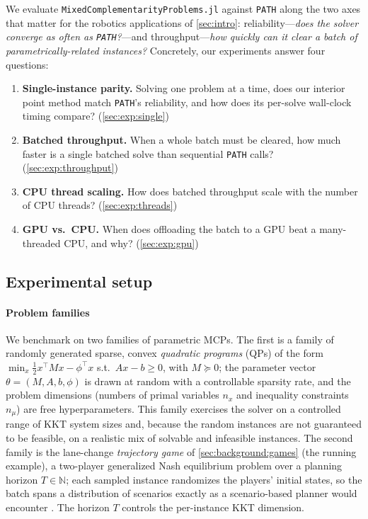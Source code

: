 \documentclass[conference]{IEEEtran}
\begin{document}
We evaluate \texttt{MixedComplementarityProblems.jl} against \texttt{PATH} along the two
axes that matter for the robotics applications of \cref{sec:intro}: reliability---\emph{does the solver converge as often as \texttt{PATH}?}---and throughput---\emph{how quickly
can it clear a batch of parametrically-related instances?} Concretely, our experiments
answer four questions:
\begin{enumerate}
  \item \textbf{Single-instance parity.} Solving one problem at a time, does our
  interior point method match \texttt{PATH}'s reliability, and how does its per-solve
  wall-clock timing compare? (\cref{sec:exp:single})
  \item \textbf{Batched throughput.} When a whole batch must be cleared, how much faster
  is a single batched solve than sequential \texttt{PATH} calls? (\cref{sec:exp:throughput})
  \item \textbf{CPU thread scaling.} How does batched throughput scale with the number of
  CPU threads? (\cref{sec:exp:threads})
  \item \textbf{GPU vs.\ CPU.} When does offloading the batch to a GPU beat a
  many-threaded CPU, and why? (\cref{sec:exp:gpu})
\end{enumerate}

\subsection{Experimental setup}
\label{sec:exp:setup}

\paragraph{Problem families}
We benchmark on two families of parametric MCPs. The first is a family of randomly
generated sparse, convex \emph{quadratic programs} (QPs) of the form $\min_x \tfrac12
x^\top M x - \phi^\top x$ s.t.\ $Ax - b \ge 0$, with $M \succeq 0$; the parameter vector
$\theta = (M, A, b, \phi)$ is drawn at random with a controllable sparsity rate, and the
problem dimensions (numbers of primal variables $n_x$ and inequality constraints
$n_\mu$) are free hyperparameters. This family exercises the solver on a controlled range of KKT
system sizes and, because the random instances are not guaranteed to be feasible, on a realistic
mix of solvable and infeasible instances. The second family is the lane-change
\emph{trajectory game} of \cref{sec:background:games} (the running example), a two-player
generalized Nash equilibrium problem over a planning horizon $T \in \mathbb{N}$; each sampled instance
randomizes the players' initial states, so the batch spans a
distribution of scenarios exactly as a scenario-based planner would encounter
\cite{li2023scenario}. The horizon $T$ controls the per-instance KKT dimension.
\end{document}

